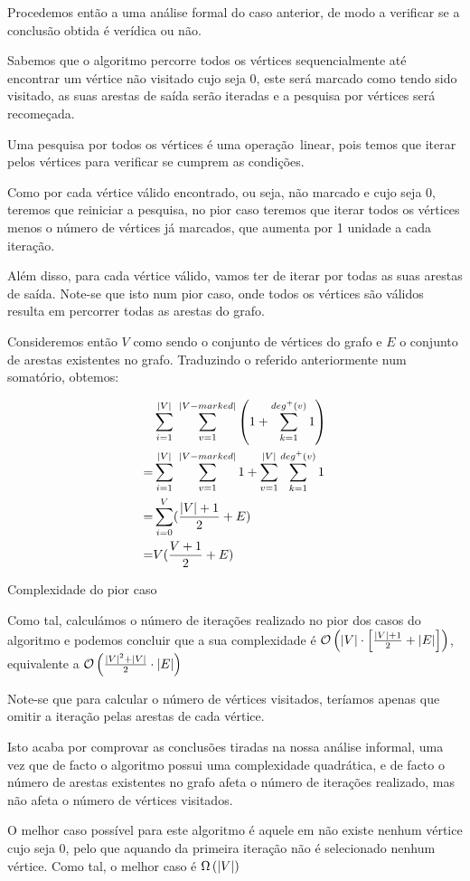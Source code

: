 Procedemos então a uma análise formal do caso anterior, de modo a
verificar se a conclusão obtida é verídica ou não.

Sabemos que o algoritmo percorre todos os vértices sequencialmente até encontrar
um vértice não visitado cujo  seja 0, este será marcado como
tendo sido visitado, as suas arestas de saída serão iteradas e a pesquisa por
vértices será recomeçada.

Uma pesquisa por todos os vértices é uma operação linear, pois temos que iterar
pelos vértices para verificar se cumprem as condições.

Como por cada vértice válido encontrado, ou seja, não marcado e cujo
 seja 0, teremos que reiniciar a pesquisa, no pior caso
teremos que iterar todos os vértices menos o número de vértices já marcados, 
que aumenta por 1 unidade a cada iteração.

Além disso, para cada vértice válido, vamos ter de iterar por todas as suas
arestas de saída. Note-se que isto num pior caso, onde todos os vértices são
válidos resulta em percorrer todas as arestas do grafo.

Consideremos então $V$ como sendo o conjunto de vértices do grafo e $E$ o
conjunto de arestas existentes no grafo. Traduzindo o referido anteriormente num
somatório, obtemos:

\begin{listing}[H]
	\begin{align}
		  & \sum_{i = 1}^{\norm{V}} \; \sum_{v=1}^{\norm{V - marked}}
		\left( 1 + \sum_{k=1}^{deg^+(v)} 1 \right)             \\
		= & \sum_{i = 1}^{\norm{V}} \; \sum_{v=1}^{\norm{V - marked}} 1
		+ \sum_{v=1}^{\norm{V}} \sum_{k=1}^{deg^+(v)} 1        \\
    = & \sum_{i=0}^{V} (\frac{\norm{V}+1}{2} + E)                             \\
    = & V(\frac{V+1}{2}+E)
	\end{align}
	\caption{Complexidade do pior caso}
\end{listing}

Como tal, calculámos o número de iterações realizado no pior dos
casos do algoritmo e podemos concluir que a sua complexidade é
$\mathcal{O}\left(\left\lvert V \right\rvert \cdot \left[ \frac{\left\lvert V \right\rvert+1}{2} + \left\lvert E \right\rvert \right] \right)$,
equivalente a
$\mathcal{O}\left(\frac{\left\lvert V \right\rvert^2 + \left\lvert V \right\rvert}{2} \cdot \left\lvert E \right\rvert \right)$

Note-se que para calcular o número de vértices visitados, teríamos apenas que
omitir a iteração pelas arestas de cada vértice.

Isto acaba por comprovar as conclusões tiradas na nossa análise informal, uma
vez que de facto o algoritmo possui uma complexidade quadrática, e de facto o
número de arestas existentes no grafo afeta o número de iterações realizado, mas
não afeta o número de vértices visitados.

O melhor caso possível para este algoritmo é aquele em não existe
nenhum vértice cujo  seja 0, pelo que aquando da
primeira iteração não é selecionado nenhum vértice. Como tal, o
melhor caso é $\Omega\left(\left\lvert V \right\rvert\right)$
